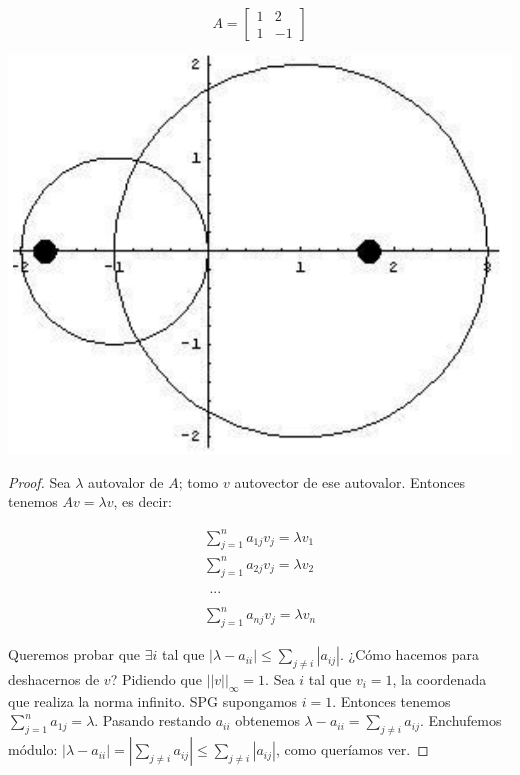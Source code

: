 \documentclass[10pt,a4paper,final]{report}
\begin{document}
\[
A=
  \begin{bmatrix}
    1 & 2 \\
    1 & -1
  \end{bmatrix}
\]

\includegraphics[scale=0.4]{gershgorin.png}
\begin{proof}
	Sea $\lambda$ autovalor de $A$; tomo $v$ autovector de ese autovalor.
	Entonces tenemos $Av = \lambda v$, es decir:
	
\begin{align*}
\displaystyle \sum_{j=1}^n a_{1j} v_j = \lambda v_1\\
\displaystyle \sum_{j=1}^n a_{2j} v_j = \lambda v_2\\
\begin{gathered}
...
\end{gathered}\\
\displaystyle \sum_{j=1}^n a_{nj} v_j = \lambda v_n
\end{align*}

Queremos probar que $\exists i$ tal que $|\lambda - a_{ii}| \leq \displaystyle \sum_{j \neq i} |a_{ij}|$. ¿Cómo hacemos para deshacernos de $v$? Pidiendo que $||v||_\infty = 1$. Sea $i$ tal que $v_i = 1$, la coordenada que realiza la norma infinito. SPG supongamos $i=1$. Entonces tenemos $\displaystyle \sum_{j=1}^n a_{1j} = \lambda$. Pasando restando $a_{ii}$ obtenemos $\lambda - a_{ii} = \displaystyle \sum_{j \neq i} a_{ij}$. Enchufemos módulo: $|\lambda - a_{ii}| = |\displaystyle \sum_{j \neq i} a_{ij}| \leq \displaystyle \sum_{j \neq i} |a_{ij}|$, como queríamos ver.

\end{proof}
\end{document}
